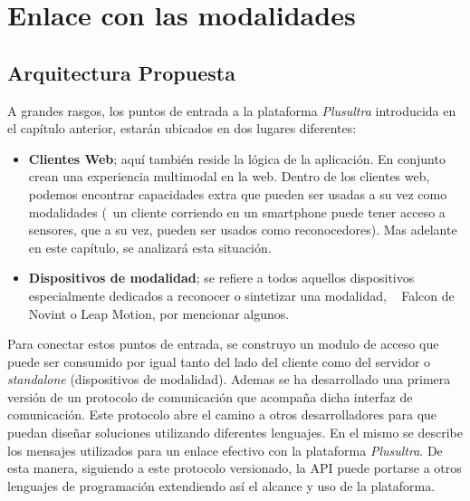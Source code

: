 
\chapter{Enlace con las modalidades} %

\label{ch:enlace} 



 

\section{Arquitectura Propuesta} \label{sec:enlace_overview}
A grandes rasgos, los puntos de entrada a la plataforma \emph{Plusultra} introducida en el capítulo anterior, estarán ubicados en dos lugares diferentes:

\begin{itemize}
\item \textbf{Clientes Web}; aquí también reside la lógica de la aplicación. En conjunto crean una experiencia multimodal en la web. Dentro de los clientes web, podemos encontrar capacidades extra que pueden ser usadas a su vez como modalidades (\ie ~un cliente corriendo en un smartphone puede tener acceso a sensores, que a su vez, pueden ser usados como reconocedores). Mas adelante en este capítulo, se analizará esta situación.
\item \textbf{Dispositivos de modalidad}; se refiere a todos aquellos dispositivos especialmente dedicados a reconocer o sintetizar una modalidad, \eg~ Falcon de Novint o Leap Motion, por mencionar algunos.
\end{itemize}

Para conectar estos puntos de entrada, se construyo un modulo de acceso que puede ser consumido por igual tanto del lado del cliente como del servidor o \emph{standalone} (dispositivos de modalidad). Ademas se ha desarrollado una primera versión de un protocolo de comunicación que acompaña dicha interfaz de comunicación. Este protocolo abre el camino a otros desarrolladores para que puedan diseñar soluciones utilizando diferentes lenguajes. 
En el mismo se describe los mensajes utilizados para un enlace efectivo con la plataforma \emph{Plusultra}. De esta manera, siguiendo a este protocolo versionado, la API puede portarse a otros lenguajes de programación extendiendo así el alcance y uso de la plataforma.


